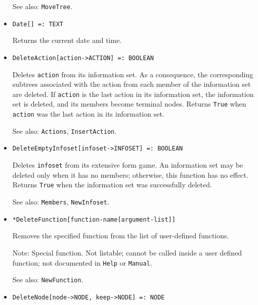 \begin{itemize}
\item
[See also:] \verb+MoveTree+.
\ed


\item
\protect \large \begin{verbatim}
Date[] =: TEXT
\end{verbatim}\normalsize

\bd
Returns the current date and time. 
\ed

\item
\protect \large \begin{verbatim}
DeleteAction[action->ACTION] =: BOOLEAN
\end{verbatim}\normalsize

\bd
Deletes \verb+action+ from its information set. 
As a consequence, the corresponding subtrees associated
with the action from each member of the information set are deleted.
If \verb+action+ is the last action in its information set, the
information set is deleted, and its members become terminal nodes.
Returns \verb+True+ when \verb+action+ was the last action in its
information set.
\item [See also:] \verb+Actions+, \verb+InsertAction+.
\ed

\item
\protect \large \begin{verbatim}
DeleteEmptyInfoset[infoset->INFOSET] =: BOOLEAN
\end{verbatim}\normalsize

\bd
Deletes \verb+infoset+ from its extensive form game.  An information set
may be deleted only when it has no members; otherwise, this function has
no effect.  Returns \verb+True+ when the information set was successfully
deleted.
\item [See also:] \verb+Members+, \verb+NewInfoset+.
\ed

\item
\protect \large \begin{verbatim}
*DeleteFunction[function-name[argument-list]]
\end{verbatim}\normalsize

\bd
Removes the specified function from the list of user-defined functions.
\item [Note:] Special function. Not listable; cannot be called inside
a user defined function; not documented in \verb+Help+ or \verb+Manual+.  
\item [See also:] \verb+NewFunction+.
\ed

\item
\protect \large \begin{verbatim}
DeleteNode[node->NODE, keep->NODE] =: NODE
\end{verbatim}\normalsize


\end{itemize}
